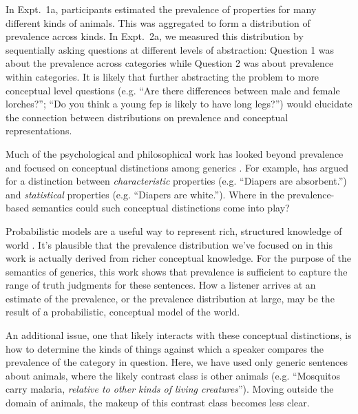\documentclass[10pt,letterpaper]{article}
\begin{document}
In Expt.~1a, participants estimated the prevalence of properties for many different kinds of animals. This was aggregated to form a distribution of prevalence across kinds.
In Expt.~2a, we measured this distribution by sequentially asking questions at different levels of abstraction: Question 1 was about the prevalence across categories while Question 2 was about prevalence within categories. 
It is likely that further abstracting the problem to more conceptual level questions (e.g. ``Are there differences between male and female lorches?''; ``Do you think a young fep is likely to have long legs?'') would elucidate the connection between distributions on prevalence and conceptual representations. 

Much of the psychological and philosophical work has looked beyond prevalence and focused on conceptual distinctions among generics \cite{Prasada2013, Leslie2008}. For example, \citeauthor{Prasada2013} has argued for a distinction between \emph{characteristic} properties (e.g. ``Diapers are absorbent.'') and \emph{statistical} properties (e.g. ``Diapers are white.''). Where in the prevalence-based semantics could such conceptual distinctions come into play?

Probabilistic models are a useful way to represent rich, structured knowledge of world \cite{Goodmanconcepts}. It's plausible that the prevalence distribution we've focused on in this work is actually derived from richer conceptual knowledge. For the purpose of the semantics of generics, this work shows that prevalence is sufficient to capture the range of truth judgments for these sentences. How a listener arrives at an estimate of the prevalence, or the prevalence distribution at large, may be the result of a probabilistic, conceptual model of the world. 

An additional issue, one that likely interacts with these conceptual distinctions, is how to determine the kinds of things against which a speaker compares the prevalence of the category in question. Here, we have used only generic sentences about animals, where the likely contrast class is other animals (e.g. ``Mosquitos carry malaria, \emph{relative to other kinds of living creatures}''). Moving outside the domain of animals, the makeup of this contrast class becomes less clear. 
\end{document}
